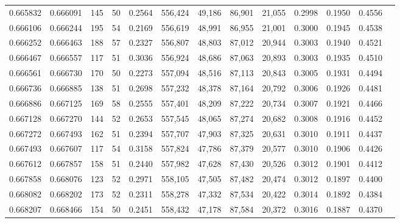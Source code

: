\begin{tabular}{rrrrrrrrrrrrr}
0.665832 & 0.666091 &   145 &  50 &                                     0.2564 & 556,424 &  49,186 &  86,901 &  21,055 & 0.2998 & 0.1950 & 0.4556 \\
0.666106 & 0.666244 &   195 &  54 &                                     0.2169 & 556,619 &  48,991 &  86,955 &  21,001 & 0.3000 & 0.1945 & 0.4538 \\
0.666252 & 0.666463 &   188 &  57 &                                     0.2327 & 556,807 &  48,803 &  87,012 &  20,944 & 0.3003 & 0.1940 & 0.4521 \\
0.666467 & 0.666557 &   117 &  51 &                                     0.3036 & 556,924 &  48,686 &  87,063 &  20,893 & 0.3003 & 0.1935 & 0.4510 \\
0.666561 & 0.666730 &   170 &  50 &                                     0.2273 & 557,094 &  48,516 &  87,113 &  20,843 & 0.3005 & 0.1931 & 0.4494 \\
0.666736 & 0.666885 &   138 &  51 &                                     0.2698 & 557,232 &  48,378 &  87,164 &  20,792 & 0.3006 & 0.1926 & 0.4481 \\
0.666886 & 0.667125 &   169 &  58 &                                     0.2555 & 557,401 &  48,209 &  87,222 &  20,734 & 0.3007 & 0.1921 & 0.4466 \\
0.667128 & 0.667270 &   144 &  52 &                                     0.2653 & 557,545 &  48,065 &  87,274 &  20,682 & 0.3008 & 0.1916 & 0.4452 \\
0.667272 & 0.667493 &   162 &  51 &                                     0.2394 & 557,707 &  47,903 &  87,325 &  20,631 & 0.3010 & 0.1911 & 0.4437 \\
0.667493 & 0.667607 &   117 &  54 &                                     0.3158 & 557,824 &  47,786 &  87,379 &  20,577 & 0.3010 & 0.1906 & 0.4426 \\
0.667612 & 0.667857 &   158 &  51 &                                     0.2440 & 557,982 &  47,628 &  87,430 &  20,526 & 0.3012 & 0.1901 & 0.4412 \\
0.667858 & 0.668076 &   123 &  52 &                                     0.2971 & 558,105 &  47,505 &  87,482 &  20,474 & 0.3012 & 0.1897 & 0.4400 \\
0.668082 & 0.668202 &   173 &  52 &                                     0.2311 & 558,278 &  47,332 &  87,534 &  20,422 & 0.3014 & 0.1892 & 0.4384 \\
0.668207 & 0.668466 &   154 &  50 &                                     0.2451 & 558,432 &  47,178 &  87,584 &  20,372 & 0.3016 & 0.1887 & 0.4370 \\

\end{tabular}
